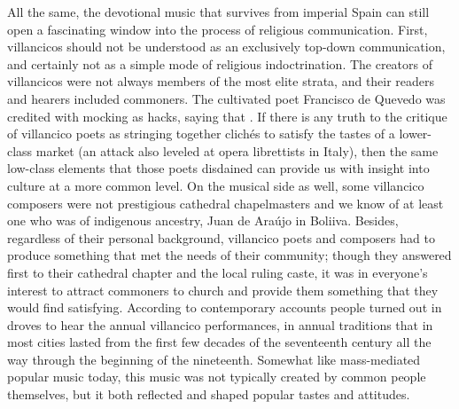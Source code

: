 All the same, the devotional music that survives from imperial Spain
can still open a fascinating window into the process of religious communication.
First, villancicos should not be understood as an exclusively top-down
communication, and certainly not as a simple mode of religious indoctrination.
The creators of villancicos were not always members of the most elite strata,
and their readers and hearers included commoners.
The cultivated poet Francisco de Quevedo was credited with mocking  as hacks, saying that .%
    \Autocite[37]{Torres:SuenosMorales}
If there is any truth to the critique of villancico poets as stringing together
clichés to satisfy the tastes of a lower-class market (an attack also leveled at
opera librettists in Italy), then the same low-class elements that those poets
disdained can provide us with insight into culture at a more common level.
On the musical side as well, some villancico composers were not prestigious
cathedral chapelmasters and we know of at least one who was of indigenous
ancestry, Juan de Araújo in Boliiva.%
    \Autocite{Illari:Popular}
Besides, regardless of their personal background, villancico poets and composers
had to produce something that met the needs of their community; though they
answered first to their cathedral chapter and the local ruling caste, it was in
everyone's interest to attract commoners to church and provide them something
that they would find satisfying.
According to contemporary accounts people turned out in droves to hear the
annual villancico performances, in annual traditions that in most cities lasted
from the first few decades of the seventeenth century all the way through the
beginning of the nineteenth.
Somewhat like mass-mediated popular music today, this music was not typically
created by common people themselves, but it both reflected and shaped popular
tastes and attitudes.




